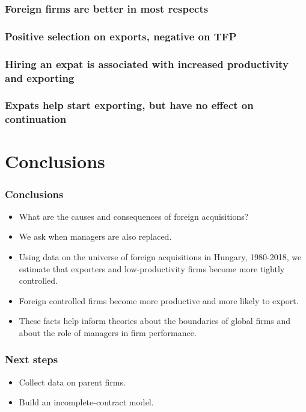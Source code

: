 \documentclass[aspectratio=43,compress,mathserif]{beamer}
\newcommand{\regressiontable}[1]{}
\begin{document}
\begin{frame}\frametitle{Foreign firms are better in most respects}\hypertarget{Foreign firms are better in most respects}{}
\regressiontable{cross_section}


\end{frame}



\begin{frame}\frametitle{Positive selection on exports, negative on TFP}\hypertarget{Positive selection on exports, negative on TFP}{}
\regressiontable{selection}


\end{frame}



\begin{frame}\frametitle{Hiring an expat is associated with increased productivity and exporting}\hypertarget{Hiring an expat is associated with increased productivity and exporting}{}
\regressiontable{diffindiff}


\end{frame}



\begin{frame}\frametitle{Expats help start exporting, but have no effect on continuation}\hypertarget{Expats help start exporting, but have no effect on continuation}{}
\regressiontable{exporter}


\end{frame}







\section{Conclusions}\hypertarget{Conclusions}{}
\begin{frame}\frametitle{Conclusions}\hypertarget{Conclusions}{}
\begin{itemize}
\item What are the causes and consequences of foreign acquisitions?

\item We ask when managers are also replaced.

\item Using data on the universe of foreign acquisitions in Hungary, 1980-2018, we estimate that exporters and low-productivity firms become more tightly controlled. 

\item Foreign controlled firms become more productive and more likely to export. 

\item These facts help inform theories about the boundaries of global firms and about the role of managers in firm performance.


\end{itemize}
\end{frame}



\begin{frame}\frametitle{Next steps}\hypertarget{Next steps}{}
\begin{itemize}
\item Collect data on parent firms.

\item Build an incomplete-contract model.


\end{itemize}
\end{frame}
\end{document}

